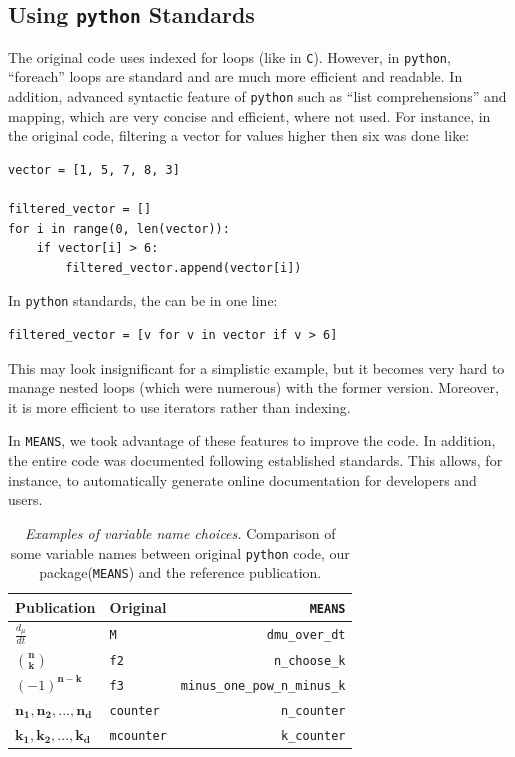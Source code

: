 \documentclass[11pt,a4paper]{article}
\newcommand{\means}{\texttt{MEANS}}
\newcommand{\py}{\texttt{python}}
\begin{document}
\subsection{Using \py{} Standards}
The original code uses indexed for loops (like in \texttt{C}).
However, in \py, ``foreach'' loops are  standard and are much more efficient and readable.
In addition, advanced syntactic feature of \py{} such as ``list comprehensions''  and mapping,
which are very concise and efficient, where not used.
For instance, in the original code, filtering a vector for values higher then six was done like:

\begin{verbatim}
vector = [1, 5, 7, 8, 3]

filtered_vector = []
for i in range(0, len(vector)):
    if vector[i] > 6:
        filtered_vector.append(vector[i])
\end{verbatim}

In \py{} standards, the can be in one line:

\begin{verbatim}
filtered_vector = [v for v in vector if v > 6]
\end{verbatim}

This may look insignificant for a simplistic example, but it becomes very hard to manage nested loops (which were numerous) with the former version.
Moreover, it is more efficient to use iterators rather than indexing.

In \means, we took advantage of these features to improve the code.
In addition, the entire code was documented following established standards.
This allows, for instance, to automatically generate online documentation for developers and users.



\begin{table}[tbh]
\caption{\emph{Examples of variable name choices.}
Comparison of some  variable names between original \py{} code, our package(\means) and the reference publication.
}

\begin{center}   
    \begin{tabular}{ | l | l | r|}
    \hline
    \bf{Publication\cite{ale_general_2013}} & \bf{Original} & \bf{\means}\\
    \hline
    \hline
    $\frac{d_{\mu}}{dt}$ & \verb"M" & \verb"dmu_over_dt"\\
    \hline
    $\mathbf{n\choose{k}}$ & \verb"f2" & \verb"n_choose_k"\\
    \hline
    $ (-1)^\mathbf{{n-k}}$ & \verb"f3" & \verb"minus_one_pow_n_minus_k"\\
    \hline
    $\mathbf{n_1    , n_2, ..., n_d}$ & \verb"counter" & \verb"n_counter"\\
    \hline
    $\mathbf{k_1, k_2, ..., k_d}$ & \verb"mcounter" & \verb"k_counter"\\
    \hline
    \end{tabular}
\end{center}
\label{tab:varnames}
\end{table}
\end{document}
